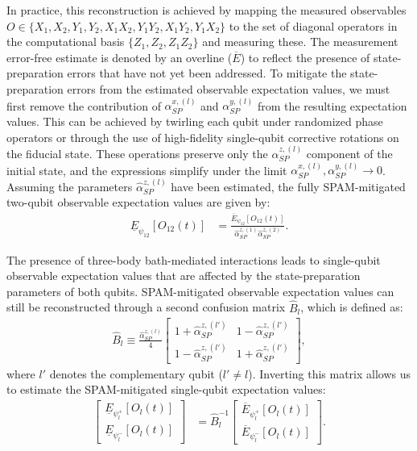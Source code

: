 \documentclass[%
 reprint,
superscriptaddress,
 amsmath,amssymb,
 aps,
pra,
floatfix,
]{revtex4-2}
\begin{document}
In practice, this reconstruction is achieved by mapping the measured observables $O\in\{X_1,X_2,Y_1,Y_2,X_1X_2,Y_1Y_2,X_1Y_2,Y_1X_2\}$ to the set of diagonal operators in the computational basis \textemdash $\{Z_1,Z_2,Z_1Z_2\}$ \textemdash and measuring these. The measurement error-free estimate is denoted by an overline ($\overline{E}$) to reflect the presence of state-preparation errors that have not yet been addressed. To mitigate the state-preparation errors from the estimated observable expectation values, we must first remove the contribution of $\alpha_{SP}^{x,(l)}$ and $\alpha_{SP}^{y,(l)}$ from the resulting expectation values. This can be achieved by twirling each qubit under randomized phase operators or through the use of high-fidelity single-qubit corrective rotations on the fiducial state. These operations preserve only the $\alpha^{z,(l)}_{SP}$ component of the initial state, and the expressions simplify under the limit $\alpha^{x,(l)}_{SP},\alpha^{y,(l)}_{SP}\rightarrow 0$. Assuming the parameters $\hat{\alpha}^{z,(l)}_{SP}$ have been estimated, the fully SPAM-mitigated two-qubit observable expectation values are given by:
\begin{align}
    \underline{E}_{\psi_{12}}\left[O_{12}(t)\right]&=\frac{\overline{E}_{\psi_{12}}\left[O_{12}(t)\right]}{\hat{\alpha}^{z,(1)}_{SP}\hat{\alpha}^{z,(2)}_{SP}}.
\end{align}

The presence of three-body bath-mediated interactions leads to single-qubit observable expectation values that are affected by the state-preparation parameters of both qubits. SPAM-mitigated observable expectation values can still be reconstructed through a second confusion matrix $\hat{B}_l$, which is defined as:
\begin{align}
    \hat{B}_l\equiv\frac{\hat{\alpha}_{SP}^{z,(l)}}{4}\begin{bmatrix}
        1+\hat{\alpha}_{SP}^{z,(l')} & 1-\hat{\alpha}_{SP}^{z,(l')}\\
        1-\hat{\alpha}_{SP}^{z,(l')} & 1+\hat{\alpha}_{SP}^{z,(l')}
    \end{bmatrix},
\end{align}
where $l'$ denotes the complementary qubit ($l' \neq l$). Inverting this matrix allows us to estimate the SPAM-mitigated single-qubit expectation values:
\begin{align}
    \begin{bmatrix}
        \underline{E}_{\psi_l^+}\left[O_l(t)\right]\\
        \underline{E}_{\psi_l^-}\left[O_l(t)\right]
    \end{bmatrix}&=\hat{B}_l^{-1}\begin{bmatrix}
        \overline{E}_{\psi_l^+}\left[O_l(t)\right]\\
        \overline{E}_{\psi_l^-}\left[O_l(t)\right]
    \end{bmatrix}.
\end{align}
\end{document}
